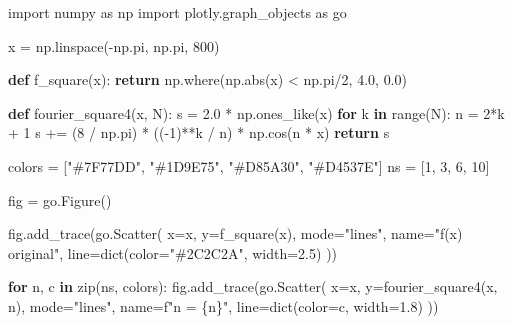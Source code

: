 \documentclass[
  letterpaper,
  DIV=11,
  numbers=noendperiod]{scrreprt}
\newenvironment{Shaded}{\begin{snugshade}}{\end{snugshade}}
\newcommand{\BuiltInTok}[1]{\textcolor[rgb]{0.00,0.23,0.31}{#1}}
\newcommand{\ControlFlowTok}[1]{\textcolor[rgb]{0.00,0.23,0.31}{\textbf{#1}}}
\newcommand{\DecValTok}[1]{\textcolor[rgb]{0.68,0.00,0.00}{#1}}
\newcommand{\FloatTok}[1]{\textcolor[rgb]{0.68,0.00,0.00}{#1}}
\newcommand{\ImportTok}[1]{\textcolor[rgb]{0.00,0.46,0.62}{#1}}
\newcommand{\KeywordTok}[1]{\textcolor[rgb]{0.00,0.23,0.31}{\textbf{#1}}}
\newcommand{\NormalTok}[1]{\textcolor[rgb]{0.00,0.23,0.31}{#1}}
\newcommand{\OperatorTok}[1]{\textcolor[rgb]{0.37,0.37,0.37}{#1}}
\newcommand{\SpecialCharTok}[1]{\textcolor[rgb]{0.37,0.37,0.37}{#1}}
\newcommand{\SpecialStringTok}[1]{\textcolor[rgb]{0.13,0.47,0.30}{#1}}
\newcommand{\StringTok}[1]{\textcolor[rgb]{0.13,0.47,0.30}{#1}}
\begin{document}
\begin{Shaded}
\begin{Highlighting}[]
\ImportTok{import}\NormalTok{ numpy }\ImportTok{as}\NormalTok{ np}
\ImportTok{import}\NormalTok{ plotly.graph\_objects }\ImportTok{as}\NormalTok{ go}

\NormalTok{x }\OperatorTok{=}\NormalTok{ np.linspace(}\OperatorTok{{-}}\NormalTok{np.pi, np.pi, }\DecValTok{800}\NormalTok{)}

\KeywordTok{def}\NormalTok{ f\_square(x):}
    \ControlFlowTok{return}\NormalTok{ np.where(np.}\BuiltInTok{abs}\NormalTok{(x) }\OperatorTok{\textless{}}\NormalTok{ np.pi}\OperatorTok{/}\DecValTok{2}\NormalTok{, }\FloatTok{4.0}\NormalTok{, }\FloatTok{0.0}\NormalTok{)}

\KeywordTok{def}\NormalTok{ fourier\_square4(x, N):}
\NormalTok{    s }\OperatorTok{=} \FloatTok{2.0} \OperatorTok{*}\NormalTok{ np.ones\_like(x)}
    \ControlFlowTok{for}\NormalTok{ k }\KeywordTok{in} \BuiltInTok{range}\NormalTok{(N):}
\NormalTok{        n }\OperatorTok{=} \DecValTok{2}\OperatorTok{*}\NormalTok{k }\OperatorTok{+} \DecValTok{1}
\NormalTok{        s }\OperatorTok{+=}\NormalTok{ (}\DecValTok{8} \OperatorTok{/}\NormalTok{ np.pi) }\OperatorTok{*}\NormalTok{ ((}\OperatorTok{{-}}\DecValTok{1}\NormalTok{)}\OperatorTok{**}\NormalTok{k }\OperatorTok{/}\NormalTok{ n) }\OperatorTok{*}\NormalTok{ np.cos(n }\OperatorTok{*}\NormalTok{ x)}
    \ControlFlowTok{return}\NormalTok{ s}

\NormalTok{colors }\OperatorTok{=}\NormalTok{ [}\StringTok{"\#7F77DD"}\NormalTok{, }\StringTok{"\#1D9E75"}\NormalTok{, }\StringTok{"\#D85A30"}\NormalTok{, }\StringTok{"\#D4537E"}\NormalTok{]}
\NormalTok{ns     }\OperatorTok{=}\NormalTok{ [}\DecValTok{1}\NormalTok{, }\DecValTok{3}\NormalTok{, }\DecValTok{6}\NormalTok{, }\DecValTok{10}\NormalTok{]}

\NormalTok{fig }\OperatorTok{=}\NormalTok{ go.Figure()}

\NormalTok{fig.add\_trace(go.Scatter(}
\NormalTok{    x}\OperatorTok{=}\NormalTok{x, y}\OperatorTok{=}\NormalTok{f\_square(x),}
\NormalTok{    mode}\OperatorTok{=}\StringTok{"lines"}\NormalTok{, name}\OperatorTok{=}\StringTok{"f(x) original"}\NormalTok{,}
\NormalTok{    line}\OperatorTok{=}\BuiltInTok{dict}\NormalTok{(color}\OperatorTok{=}\StringTok{"\#2C2C2A"}\NormalTok{, width}\OperatorTok{=}\FloatTok{2.5}\NormalTok{)}
\NormalTok{))}

\ControlFlowTok{for}\NormalTok{ n, c }\KeywordTok{in} \BuiltInTok{zip}\NormalTok{(ns, colors):}
\NormalTok{    fig.add\_trace(go.Scatter(}
\NormalTok{        x}\OperatorTok{=}\NormalTok{x, y}\OperatorTok{=}\NormalTok{fourier\_square4(x, n),}
\NormalTok{        mode}\OperatorTok{=}\StringTok{"lines"}\NormalTok{, name}\OperatorTok{=}\SpecialStringTok{f"n = }\SpecialCharTok{\{}\NormalTok{n}\SpecialCharTok{\}}\SpecialStringTok{"}\NormalTok{,}
\NormalTok{        line}\OperatorTok{=}\BuiltInTok{dict}\NormalTok{(color}\OperatorTok{=}\NormalTok{c, width}\OperatorTok{=}\FloatTok{1.8}\NormalTok{)}
\NormalTok{    ))}


\end{Highlighting}
\end{Shaded}
\end{document}

